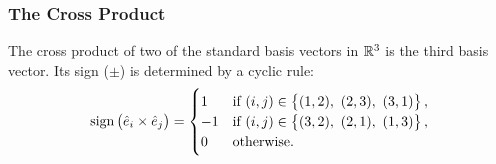 \begin{frame}
  \frametitle{The Cross Product}
  \begin{presentation_note}
  The cross product of two of the standard basis vectors in $\mathbb{R}^{3}$ is the third basis vector. Its sign ($\pm$) is determined by a cyclic rule:
  \begin{equation*}
  \text{sign}\left( \hat{e}_{i}\times\hat{e}_{j} \right) =
  \begin{cases}
  1 & \text{if } (i,j)\in \left\{(1,2),\ (2,3),\ (3,1)\right\},\\
  -1 & \text{if } (i,j)\in \left\{(3,2),\ (2,1),\ (1,3)\right\},\\
  0 & \text{otherwise}.
  \end{cases}
  \end{equation*}
  \end{presentation_note}

\end{frame}
